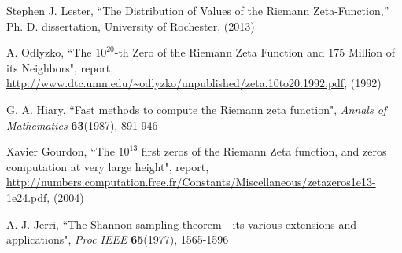 \documentclass[twoside]{article}
\begin{document}
\begin{thebibliography}{10}
 Stephen J. Lester, ``The Distribution of Values of the
Riemann Zeta-Function,''
Ph. D. dissertation, University of Rochester,  (2013)

  A. Odlyzko,
``The $10^{20}$-th Zero of the Riemann Zeta
Function and 175 Million of its Neighbors", report,
\url{http://www.dtc.umn.edu/~odlyzko/unpublished/zeta.10to20.1992.pdf}, (1992)

 G. A. Hiary,
``Fast methods to compute the Riemann zeta function",
{\it Annals of Mathematics} {\bf63}(1987), 891-946

 Xavier Gourdon,
``The $10^{13}$ first zeros of the Riemann Zeta function,
and zeros computation at very large height", report,
\url{http://numbers.computation.free.fr/Constants/Miscellaneous/zetazeros1e13-1e24.pdf}, (2004)

 A. J. Jerri,
``The Shannon sampling theorem - its various extensions and applications",
{\it Proc IEEE} {\bf65}(1977), 1565-1596


\end{thebibliography} 
\end{document}
